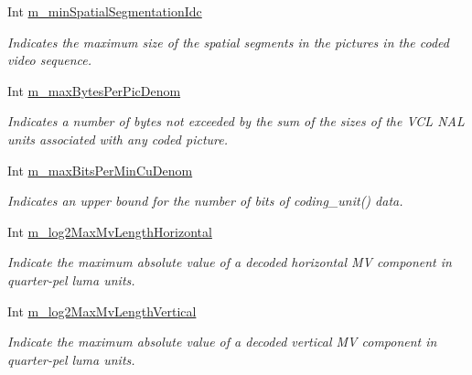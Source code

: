 \begin{DoxyCompactItemize}
\mbox{\label{class_t_enc_cfg_ac6a0613b461b9b0a3378e887fac1c418}} 
Int \hyperlink{class_t_enc_cfg_ac6a0613b461b9b0a3378e887fac1c418}{m\+\_\+min\+Spatial\+Segmentation\+Idc}
\begin{DoxyCompactList}\small\item\em Indicates the maximum size of the spatial segments in the pictures in the coded video sequence. \end{DoxyCompactList}\item 
\mbox{\label{class_t_enc_cfg_ac7e5c44c805ee61bd64070faa8b10150}} 
Int \hyperlink{class_t_enc_cfg_ac7e5c44c805ee61bd64070faa8b10150}{m\+\_\+max\+Bytes\+Per\+Pic\+Denom}
\begin{DoxyCompactList}\small\item\em Indicates a number of bytes not exceeded by the sum of the sizes of the V\+CL N\+AL units associated with any coded picture. \end{DoxyCompactList}\item 
\mbox{\label{class_t_enc_cfg_a2ba126b4ce2bf61dc271e4755ad3f6c1}} 
Int \hyperlink{class_t_enc_cfg_a2ba126b4ce2bf61dc271e4755ad3f6c1}{m\+\_\+max\+Bits\+Per\+Min\+Cu\+Denom}
\begin{DoxyCompactList}\small\item\em Indicates an upper bound for the number of bits of coding\+\_\+unit() data. \end{DoxyCompactList}\item 
\mbox{\label{class_t_enc_cfg_aaa71a636c50cf225ea5b453c58680366}} 
Int \hyperlink{class_t_enc_cfg_aaa71a636c50cf225ea5b453c58680366}{m\+\_\+log2\+Max\+Mv\+Length\+Horizontal}
\begin{DoxyCompactList}\small\item\em Indicate the maximum absolute value of a decoded horizontal MV component in quarter-\/pel luma units. \end{DoxyCompactList}\item 
\mbox{\label{class_t_enc_cfg_afbc36c700b8c4b815445daeac60033a0}} 
Int \hyperlink{class_t_enc_cfg_afbc36c700b8c4b815445daeac60033a0}{m\+\_\+log2\+Max\+Mv\+Length\+Vertical}
\begin{DoxyCompactList}\small\item\em Indicate the maximum absolute value of a decoded vertical MV component in quarter-\/pel luma units. \end{DoxyCompactList}\item 

\end{DoxyCompactItemize}
